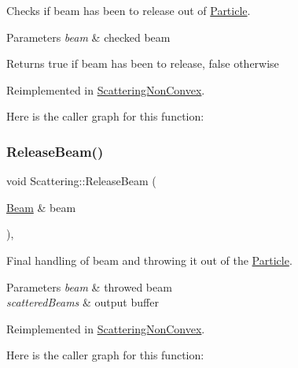 Checks if beam has been to release out of \mbox{\hyperlink{class_particle}{Particle}}. 


\begin{DoxyParams}{Parameters}
{\em beam} & checked beam \\
\hline
\end{DoxyParams}
\begin{DoxyReturn}{Returns}
true if beam has been to release, false otherwise 
\end{DoxyReturn}


Reimplemented in \mbox{\hyperlink{class_scattering_non_convex_aeda4103d997bc16e155fcc8281a51b05}{Scattering\+Non\+Convex}}.

Here is the caller graph for this function\+:
\mbox{\label{class_scattering_a6fa2a9f952577d5310d8a8e617f2c8f8}} 
\subsubsection{\texorpdfstring{Release\+Beam()}{ReleaseBeam()}}
{\footnotesize\ttfamily void Scattering\+::\+Release\+Beam (\begin{DoxyParamCaption}\item[{\mbox{\hyperlink{class_beam}{Beam}} \&}]{beam }\end{DoxyParamCaption})\hspace{0.3cm}{\ttfamily [protected]}, {\ttfamily [virtual]}}



Final handling of beam and throwing it out of the \mbox{\hyperlink{class_particle}{Particle}}. 


\begin{DoxyParams}{Parameters}
{\em beam} & throwed beam \\
\hline
{\em scattered\+Beams} & output buffer \\
\hline
\end{DoxyParams}


Reimplemented in \mbox{\hyperlink{class_scattering_non_convex_a574f2c4d503c6751f374e37e632f584a}{Scattering\+Non\+Convex}}.

Here is the caller graph for this function\+:
\mbox{\label{class_scattering_ab428bc4f6c26d02bcf7044e653cdf523}} 
